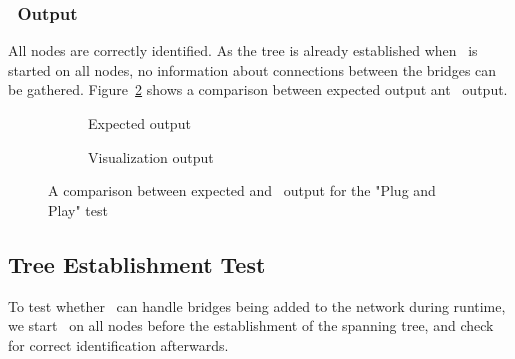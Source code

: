 \subsubsection*{\tool\ Output}
All nodes are correctly identified.
As the tree is already established when \tool\ is started on all nodes, no information about connections between the bridges can be gathered.
Figure~\ref{fig:pnp} shows a comparison between expected output ant \tool\ output.
\begin{figure}[h]
    \begin{subfigure}[b]{\textwidth}
        \centering
        \caption{Expected output}
        \label{fig:pnpExp}
    \end{subfigure}
    
    \vspace{0.5cm}

    \begin{subfigure}[b]{\textwidth}
        \centering
        \caption{Visualization output}
    \end{subfigure}
    \caption{A comparison between expected and \tool\ output for the "Plug and Play" test}
    \label{fig:pnp}
\end{figure}

\subsection*{Tree Establishment Test}
\label{tree_est_test}
To test whether \tool\ can handle bridges being added to the network during runtime, we start \tool\ on all nodes before the establishment of the spanning tree, and check for correct identification afterwards.

